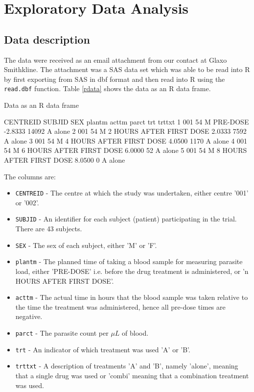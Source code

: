 \chapter{Exploratory Data Analysis}\label{data}
\section{Data description}
The data were received as an email attachment from our contact at Glaxo Smithkline. The attachment was a SAS data set which was able to be read into R by first exporting from SAS in dbf format and then read into R using the \texttt{read.dbf} function.
Table \ref{rdata} shows the data as an R data frame. 
\begin{table}[h]
\caption{Data as an R data frame}\label{rdata}
\begin{boxedverbatim}
    CENTREID SUBJID SEX                    plantm   acttm  parct trt trttxt
1        001     54   M                  PRE-DOSE -2.8333  14092   A  alone
2        001     54   M  2 HOURS AFTER FIRST DOSE  2.0333   7592   A  alone
3        001     54   M  4 HOURS AFTER FIRST DOSE  4.0500   1170   A  alone
4        001     54   M  6 HOURS AFTER FIRST DOSE  6.0000     52   A  alone
5        001     54   M  8 HOURS AFTER FIRST DOSE  8.0500      0   A  alone
\end{boxedverbatim}
\end{table}

The columns are:
\begin{itemize}
\item\texttt{CENTREID} - The centre at which the study was undertaken, either centre '001' or '002'.
\item\texttt{SUBJID} - An identifier for each subject (patient) participating in the trial. There are 43 subjects.
\item\texttt{SEX} - The sex of each subject, either 'M' or 'F'.
\item\texttt{plantm} - The planned time of taking a blood sample for measuring parasite load, either 'PRE-DOSE' i.e. before the drug treatment is administered, or 'n HOURS AFTER FIRST DOSE'.
\item\texttt{acttm} - The actual time in hours that the blood sample was taken relative to the time the treatment was administered, hence all pre-dose times are negative.
\item\texttt{parct} - The parasite count per $\mu L$ of blood.
\item\texttt{trt} - An indicator of which treatment was used 'A' or 'B'.
\item\texttt{trttxt} - A description of treatments 'A' and 'B', namely 'alone', meaning that a single drug was used or 'combi' meaning that a combination treatment was used.
\end{itemize}

